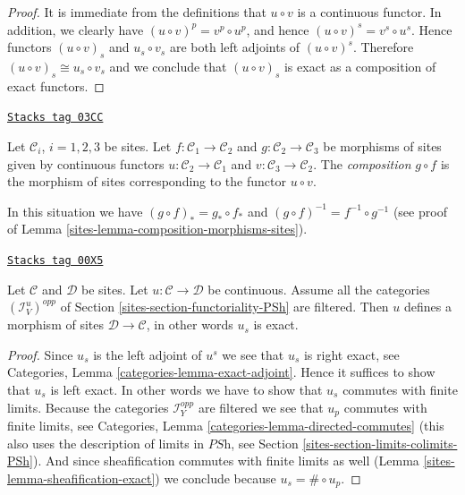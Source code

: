 \begin{proof}
It is immediate from the definitions that $u \circ v$ is a continuous functor.
In addition, we clearly have $(u \circ v)^p = v^p \circ u^p$, and hence
$(u \circ v)^s = v^s \circ u^s$. Hence functors $(u \circ v)_s$  and
$u_s \circ v_s$ are both left adjoints of $(u \circ v)^s$. Therefore
$(u \circ v)_s \cong u_s \circ v_s$ and we conclude that $(u \circ v)_s$
is exact as a composition of exact functors.
\end{proof}

\begin{definition}
\label{sites-definition-composition-morphisms-sites}
\href{https://stacks.math.columbia.edu/tag/03CC}{\texttt{Stacks tag 03CC}}

Let $\mathcal{C}_i$, $i = 1, 2, 3$ be sites. Let
$f : \mathcal{C}_1 \to \mathcal{C}_2$ and
$g : \mathcal{C}_2 \to \mathcal{C}_3$ be morphisms of sites
given by continuous functors $u : \mathcal{C}_2 \to \mathcal{C}_1$
and $v : \mathcal{C}_3 \to \mathcal{C}_2$. The {\it composition}
$g \circ f$ is the morphism of sites corresponding to the
functor $u \circ v$.
\end{definition}

In this situation we have $(g \circ f)_* = g_* \circ f_*$ and
$(g \circ f)^{-1} = f^{-1} \circ g^{-1}$ (see proof of
Lemma \ref{sites-lemma-composition-morphisms-sites}).

\begin{lemma}
\label{sites-lemma-directed-morphism}
\href{https://stacks.math.columbia.edu/tag/00X5}{\texttt{Stacks tag 00X5}}

Let $\mathcal{C}$ and $\mathcal{D}$ be sites. Let
$u : \mathcal{C} \to \mathcal{D}$ be continuous.
Assume all the categories $(\mathcal{I}_V^u)^{opp}$ of
Section \ref{sites-section-functoriality-PSh}
are filtered. Then $u$ defines a morphism of sites $\mathcal{D} \to
\mathcal{C}$, in other words $u_s$ is exact.
\end{lemma}

\begin{proof}

Since $u_s$ is the left adjoint of $u^s$ we see that $u_s$ is right
exact, see Categories, Lemma \ref{categories-lemma-exact-adjoint}.
Hence it suffices to show that $u_s$ is left exact. In other words
we have to show that $u_s$ commutes with finite limits.
Because the categories $\mathcal{I}_Y^{opp}$ are filtered
we see that $u_p$ commutes with finite limits, see
Categories, Lemma \ref{categories-lemma-directed-commutes}
(this also uses the description of limits in $\textit{PSh}$,
see Section \ref{sites-section-limits-colimits-PSh}).
And since sheafification commutes with finite limits as well
(Lemma \ref{sites-lemma-sheafification-exact}) we conclude because
$u_s = \# \circ u_p$.
\end{proof}

